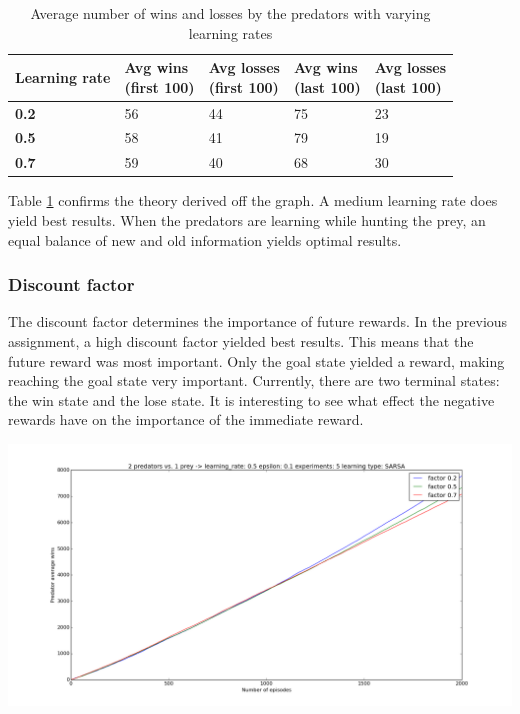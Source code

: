 \begin{table}[H]
\begin{center}
\begin{tabular}{| l | l | l | l | l |}
\hline
\parbox{2cm}{\textbf{Learning rate}} & \parbox{2cm}{\textbf{Avg wins \\ (first 100)}} & \parbox{2cm}{\textbf{Avg losses \\ (first 100)}} & \parbox{2cm}{\textbf{Avg wins \\ (last 100)}} & \parbox{2cm}{\textbf{Avg losses \\ (last 100)}} \\
\hline
\textbf{0.2} & 56 & 44 & 75 & 23 \\
\hline
\textbf{0.5} & 58 & 41 & 79 & 19 \\
\hline
\textbf{0.7} & 59 & 40 & 68 & 30 \\
\hline
\end{tabular}
\caption{Average number of wins and losses by the predators with varying learning rates}
\label{table:SARSAlearningrates}
\end{center}
\end{table}

Table \ref{table:SARSAlearningrates} confirms the theory derived off the graph. A medium learning rate does yield best results. When the predators are learning while hunting the prey, an equal balance of new and old information yields optimal results.

\subsubsection{Discount factor}
The discount factor determines the importance of future rewards. In the previous assignment, a high discount factor yielded best results. This means that the future reward was most important. Only the goal state yielded a reward, making reaching the goal state very important. Currently, there are two terminal states: the win state and the lose state. It is interesting to see what effect the negative rewards have on the importance of the immediate reward.

\begin{center}
	\includegraphics[scale=0.3]{2_predators_discount_factor_SARSA}
\end{center}


